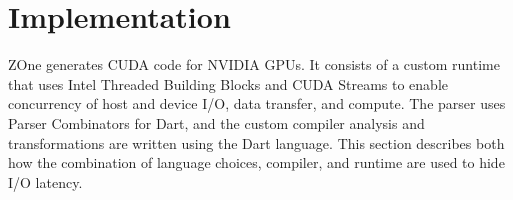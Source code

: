 \section{Implementation}

ZOne generates CUDA code for NVIDIA GPUs.
It consists of a custom
runtime that uses Intel Threaded Building Blocks and CUDA Streams to enable
concurrency of host and device I/O, data transfer, and compute. The parser
uses Parser Combinators for Dart\cite{dartparsers}, and the custom compiler
analysis and transformations are written using the Dart language.
This section describes both how the combination of language choices, compiler, and runtime are used to hide
I/O latency.





